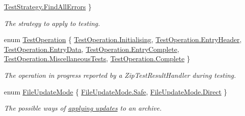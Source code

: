 \begin{DoxyCompactItemize}
\hyperlink{namespace_i_c_sharp_code_1_1_sharp_zip_lib_1_1_zip_a3a2e6526ecaa7dbfa11576c6560ad5a5acce058d6c4fa5ed825389869455449c3}{Test\+Strategy.\+Find\+All\+Errors}
 \}\begin{DoxyCompactList}\small\item\em The strategy to apply to testing. \end{DoxyCompactList}
\item 
enum \hyperlink{namespace_i_c_sharp_code_1_1_sharp_zip_lib_1_1_zip_ac2c93a91b7fd0e8c82d654452f736726}{Test\+Operation} \{ \newline
\hyperlink{namespace_i_c_sharp_code_1_1_sharp_zip_lib_1_1_zip_ac2c93a91b7fd0e8c82d654452f736726aa3aec8ad5296270028f3c01db319169d}{Test\+Operation.\+Initialising}, 
\hyperlink{namespace_i_c_sharp_code_1_1_sharp_zip_lib_1_1_zip_ac2c93a91b7fd0e8c82d654452f736726aa8912c16ecc4ad1cf5786471de3e5b95}{Test\+Operation.\+Entry\+Header}, 
\hyperlink{namespace_i_c_sharp_code_1_1_sharp_zip_lib_1_1_zip_ac2c93a91b7fd0e8c82d654452f736726a4f7029033cf7cc29e880b9e3aace388b}{Test\+Operation.\+Entry\+Data}, 
\hyperlink{namespace_i_c_sharp_code_1_1_sharp_zip_lib_1_1_zip_ac2c93a91b7fd0e8c82d654452f736726ac0ea29adfcb3c6828fda86f88de1f067}{Test\+Operation.\+Entry\+Complete}, 
\newline
\hyperlink{namespace_i_c_sharp_code_1_1_sharp_zip_lib_1_1_zip_ac2c93a91b7fd0e8c82d654452f736726af3a07f16510a95b3e5a30fce3a890b24}{Test\+Operation.\+Miscellaneous\+Tests}, 
\hyperlink{namespace_i_c_sharp_code_1_1_sharp_zip_lib_1_1_zip_ac2c93a91b7fd0e8c82d654452f736726aae94f80b3ce82062a5dd7815daa04f9d}{Test\+Operation.\+Complete}
 \}\begin{DoxyCompactList}\small\item\em The operation in progress reported by a Zip\+Test\+Result\+Handler during testing. \end{DoxyCompactList}
\item 
enum \hyperlink{namespace_i_c_sharp_code_1_1_sharp_zip_lib_1_1_zip_a626313bc452203ca2bdb092947541027}{File\+Update\+Mode} \{ \hyperlink{namespace_i_c_sharp_code_1_1_sharp_zip_lib_1_1_zip_a626313bc452203ca2bdb092947541027ac6eea0560cd6f377e78dff2c85cc9122}{File\+Update\+Mode.\+Safe}, 
\hyperlink{namespace_i_c_sharp_code_1_1_sharp_zip_lib_1_1_zip_a626313bc452203ca2bdb092947541027afd1dd0c603be8170f9eae0be9f2f6afb}{File\+Update\+Mode.\+Direct}
 \}\begin{DoxyCompactList}\small\item\em The possible ways of \hyperlink{}{applying updates} to an archive. \end{DoxyCompactList}

\end{DoxyCompactItemize}

